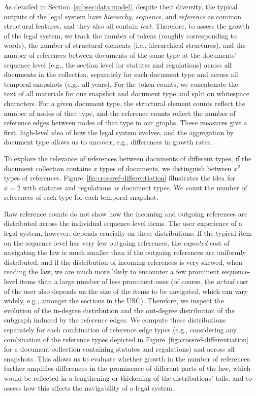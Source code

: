 \documentclass[utf8,sort&compress,table,hidelinks]{frontiersFPHY} %
\begin{document}
As detailed in Section~\ref{subsec:data:model}, despite their diversity, the typical outputs of the legal system have \emph{hierarchy}, \emph{sequence}, and \emph{reference} as common structural features, and they also all contain \emph{text}. 
Therefore, to assess the growth of the legal system, we track the number of tokens (roughly corresponding to words), the number of structural elements (i.e., hierarchical structures), and the number of references between documents of the same type at the documents' sequence level (e.g., the section level for statutes and regulations) across all documents in the collection, separately for each document type and across all temporal snapshots (e.g., all years). 
For the token counts, we concatenate the text of all materials for one snapshot and document type and split on whitespace characters. 
For a given document type, the structural element counts reflect the number of nodes of that type, and the reference counts reflect the number of reference edges between nodes of that type in our graphs.
These measures give a first, high-level idea of how the legal system evolves, and the aggregation by document type allows us to uncover, e.g., differences in growth rates. 



To explore the relevance of references between documents of different types, if the document collection contains $x$ types of documents, we distinguish between $x^2$ types of references. 
Figure~\ref{fig:crossref-differentiation} illustrates the idea for $x = 2$ with statutes and regulations as document types.
We count the number of references of each type for each temporal snapshot.

Raw reference counts do not show how the incoming and outgoing references are distributed across the individual sequence-level items. 
The user experience of a legal system, however, depends crucially on these distributions: 
If the typical item on the sequence level has very few outgoing references, the \emph{expected} cost of navigating the law is much smaller than if the outgoing references are uniformly distributed, 
and if the distribution of incoming references is very skewed, when reading the law, we are much more likely to encounter a few prominent sequence-level items than a large number of less prominent ones
(of course, the \emph{actual} cost of the user also depends on the size of the items to be navigated, which can vary widely, e.g., amongst the sections in the USC).
Therefore, we inspect the evolution of the in-degree distribution and the out-degree distribution of the subgraph induced by the reference edges.
We compute these distributions separately for each combination of reference edge types (e.g., considering any combination of the reference types depicted in Figure~\ref{fig:crossref-differentiation} for a document collection containing statutes and regulations) and across all snapshots.
This allows us to evaluate whether growth in the number of references further amplifies differences in the prominence of different parts of the law, 
which would be reflected in a lengthening or thickening of the distributions' tails, and to assess how this affects the navigability of a legal system.
\end{document}
